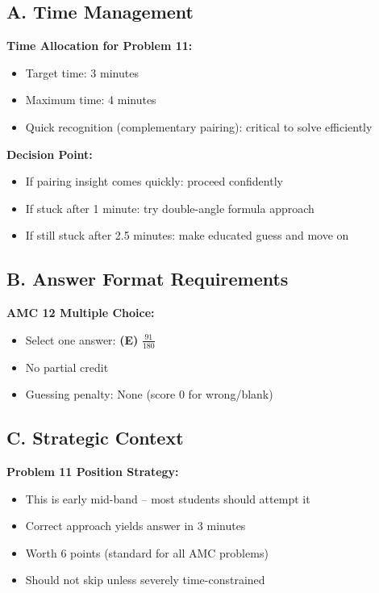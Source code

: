 \documentclass[12pt]{article}
\begin{document}
\begin{competitionbox}
\subsection*{A. Time Management}

\textbf{Time Allocation for Problem 11:}
\begin{itemize}
    \item Target time: 3 minutes
    \item Maximum time: 4 minutes
    \item Quick recognition (complementary pairing): critical to solve efficiently
\end{itemize}

\textbf{Decision Point:}
\begin{itemize}
    \item If pairing insight comes quickly: proceed confidently
    \item If stuck after 1 minute: try double-angle formula approach
    \item If still stuck after 2.5 minutes: make educated guess and move on
\end{itemize}

\subsection*{B. Answer Format Requirements}

\textbf{AMC 12 Multiple Choice:}
\begin{itemize}
    \item Select one answer: \textbf{(E)} $\frac{91}{180}$
    \item No partial credit
    \item Guessing penalty: None (score 0 for wrong/blank)
\end{itemize}

\subsection*{C. Strategic Context}

\textbf{Problem 11 Position Strategy:}
\begin{itemize}
    \item This is early mid-band -- most students should attempt it
    \item Correct approach yields answer in 3 minutes
    \item Worth 6 points (standard for all AMC problems)
    \item Should not skip unless severely time-constrained
\end{itemize}


\end{competitionbox}
\end{document}
